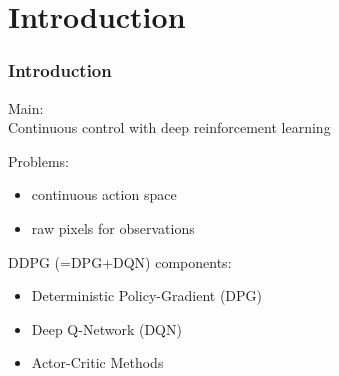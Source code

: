 \section{Introduction}

\begin{frame}
\frametitle{Introduction}
Main:\\
Continuous control with deep reinforcement learning~\cite{Lillicrap2015}
\vspace{2mm}

Problems:
\begin{itemize}
  \item continuous action space
  \item raw pixels for observations
\end{itemize}

DDPG (=DPG+DQN) components:
\begin{itemize}
  \item Deterministic Policy-Gradient (DPG) \cite{Silver2014}
  \item Deep Q-Network (DQN) \cite{Mnih2013}
  \item Actor-Critic Methods \cite{Sutton1998}
\end{itemize}


\end{frame}
